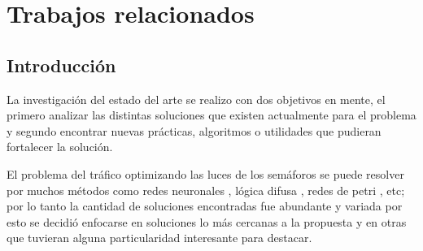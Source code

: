 \chapter{Trabajos relacionados}




\section{Introducción}
La investigación del estado del arte se realizo con dos objetivos en mente, el primero analizar las distintas soluciones que existen actualmente para el problema y segundo encontrar nuevas prácticas, algoritmos o utilidades que pudieran fortalecer la solución.

El problema del tráfico optimizando las luces de los semáforos se puede resolver por muchos métodos como  redes neuronales \citep{Lopez1999}, lógica difusa \citep{Lim2001}, redes de petri \citep{DiFebbraro2002}, etc; por lo tanto la cantidad de soluciones encontradas fue abundante y variada por esto se decidió enfocarse en soluciones lo más cercanas a la propuesta y en otras que tuvieran alguna particularidad interesante para destacar.



